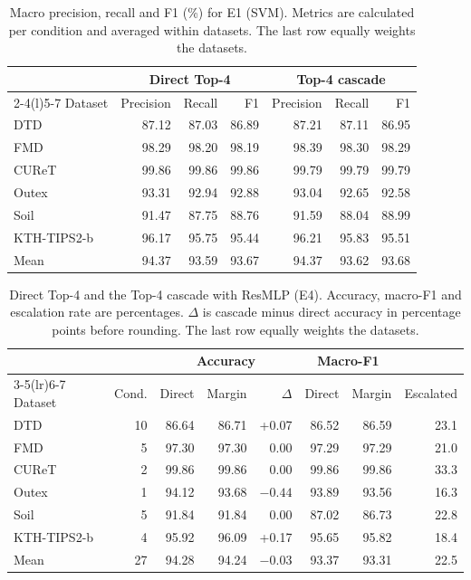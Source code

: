 \documentclass[10pt,a4paper,fleqn]{article}
\begin{document}
\begin{table}[htbp]
\centering
\caption{Macro precision, recall and F1 (\%) for E1 (SVM). Metrics are calculated per condition and averaged within datasets. The last row equally weights the datasets.}
\label{tab:e1-macro}
\begin{tabular}{@{}lrrrrrr@{}}
\toprule
 & \multicolumn{3}{c}{Direct Top-4} & \multicolumn{3}{c}{Top-4 cascade} \\
\cmidrule(lr){2-4}\cmidrule(l){5-7}
Dataset & Precision & Recall & F1 & Precision & Recall & F1 \\
\midrule
DTD & 87.12 & 87.03 & 86.89 & 87.21 & 87.11 & 86.95 \\
FMD & 98.29 & 98.20 & 98.19 & 98.39 & 98.30 & 98.29 \\
CUReT & 99.86 & 99.86 & 99.86 & 99.79 & 99.79 & 99.79 \\
Outex & 93.31 & 92.94 & 92.88 & 93.04 & 92.65 & 92.58 \\
Soil & 91.47 & 87.75 & 88.76 & 91.59 & 88.04 & 88.99 \\
KTH-TIPS2-b & 96.17 & 95.75 & 95.44 & 96.21 & 95.83 & 95.51 \\
\midrule
Mean & 94.37 & 93.59 & 93.67 & 94.37 & 93.62 & 93.68 \\
\bottomrule
\end{tabular}
\end{table}
\begin{table}[htbp]
\centering
\caption{Direct Top-4 and the Top-4 cascade with ResMLP (E4). Accuracy, macro-F1 and escalation rate are percentages. $\Delta$ is cascade minus direct accuracy in percentage points before rounding. The last row equally weights the datasets.}
\label{tab:e4-datasets}
\begin{tabular}{@{}lrrrrrrr@{}}
\toprule
 & & \multicolumn{3}{c}{Accuracy} & \multicolumn{2}{c}{Macro-F1} & \\
\cmidrule(lr){3-5}\cmidrule(lr){6-7}
Dataset & Cond. & Direct & Margin & $\Delta$ & Direct & Margin & Escalated \\
\midrule
DTD & 10 & 86.64 & 86.71 & +0.07 & 86.52 & 86.59 & 23.1 \\
FMD & 5 & 97.30 & 97.30 & 0.00 & 97.29 & 97.29 & 21.0 \\
CUReT & 2 & 99.86 & 99.86 & 0.00 & 99.86 & 99.86 & 33.3 \\
Outex & 1 & 94.12 & 93.68 & $-0.44$ & 93.89 & 93.56 & 16.3 \\
Soil & 5 & 91.84 & 91.84 & 0.00 & 87.02 & 86.73 & 22.8 \\
KTH-TIPS2-b & 4 & 95.92 & 96.09 & +0.17 & 95.65 & 95.82 & 18.4 \\
\midrule
Mean & 27 & 94.28 & 94.24 & $-0.03$ & 93.37 & 93.31 & 22.5 \\
\bottomrule
\end{tabular}
\end{table}
\FloatBarrier
\end{document}
